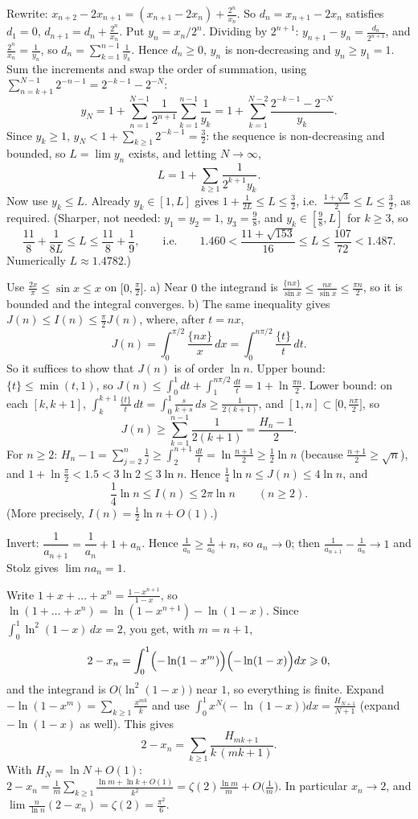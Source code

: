 \documentclass[11pt,a4paper]{article}
\begin{document}
 Rewrite: $x_{n+2}-2x_{n+1}=(x_{n+1}-2x_n)+\frac{2^n}{x_n}$. So $d_n=x_{n+1}-2x_n$ satisfies $d_1=0$, $d_{n+1}=d_n+\frac{2^n}{x_n}$.
 Put $y_n=x_n/2^n$. Dividing by $2^{n+1}$: $y_{n+1}-y_n=\frac{d_n}{2^{n+1}}$, and $\frac{2^n}{x_n}=\frac1{y_n}$, so $d_n=\sum_{k=1}^{n-1}\frac1{y_k}$. Hence $d_n\ge0$, $y_n$ is non-decreasing and $y_n\ge y_1=1$.
 Sum the increments and swap the order of summation, using $\sum_{n=k+1}^{N-1}2^{-n-1}=2^{-k-1}-2^{-N}$:
\[y_N=1+\sum_{n=1}^{N-1}\frac1{2^{n+1}}\sum_{k=1}^{n-1}\frac1{y_k}=1+\sum_{k=1}^{N-2}\frac{2^{-k-1}-2^{-N}}{y_k}.\]
Since $y_k\ge1$, $y_N<1+\sum_{k\ge1}2^{-k-1}=\frac32$: the sequence is non-decreasing and bounded, so $L=\lim y_n$ exists, and letting $N\to\infty$,
\[L=1+\sum_{k\ge1}\frac1{2^{k+1}y_k}.\]
 Now use $y_k\le L$. Already $y_k\in[1,L]$ gives $1+\frac1{2L}\le L\le\frac32$, i.e.\ $\frac{1+\sqrt3}2\le L\le\frac32$, as required. (Sharper, not needed: $y_1=y_2=1$, $y_3=\frac98$, and $y_k\in[\frac98,L]$ for $k\ge3$, so
\[\frac{11}8+\frac1{8L}\le L\le\frac{11}8+\frac19,\qquad\text{i.e.}\qquad 1.460<\frac{11+\sqrt{153}}{16}\le L\le\frac{107}{72}<1.487.\]
Numerically $L\approx1.4782$.)

 Use $\frac{2x}\pi\le\sin x\le x$ on $\bigl[0,\frac\pi2\bigr]$. a) Near $0$ the integrand is $\frac{\{nx\}}{\sin x}\le\frac{nx}{\sin x}\le\frac{\pi n}2$, so it is bounded and the integral converges. b) The same inequality gives $J(n)\le I(n)\le\frac\pi2J(n)$, where, after $t=nx$,
\[J(n)=\int_0^{\pi/2}\frac{\{nx\}}x\,dx=\int_0^{n\pi/2}\frac{\{t\}}t\,dt.\]
So it suffices to show that $J(n)$ is of order $\ln n$.
 Upper bound: $\{t\}\le\min(t,1)$, so $J(n)\le\int_0^1dt+\int_1^{n\pi/2}\frac{dt}t=1+\ln\frac{\pi n}2$. Lower bound: on each $[k,k+1]$, $\int_k^{k+1}\frac{\{t\}}t\,dt=\int_0^1\frac s{k+s}\,ds\ge\frac1{2(k+1)}$, and $[1,n]\subset\bigl[0,\frac{n\pi}2\bigr]$, so
\[J(n)\ge\sum_{k=1}^{n-1}\frac1{2(k+1)}=\frac{H_n-1}2.\]
 For $n\ge2$: $H_n-1=\sum_{j=2}^n\frac1j\ge\int_2^{n+1}\frac{dt}t=\ln\frac{n+1}2\ge\frac12\ln n$ (because $\frac{n+1}2\ge\sqrt n$), and $1+\ln\frac\pi2<1.5<3\ln2\le3\ln n$. Hence $\frac14\ln n\le J(n)\le4\ln n$, and
\[\frac14\ln n\le I(n)\le2\pi\ln n\qquad(n\ge2).\]
(More precisely, $I(n)=\frac12\ln n+O(1)$.)

 Invert: $\dfrac1{a_{n+1}}=\dfrac1{a_n}+1+a_n$.
 Hence $\frac1{a_n}\ge\frac1{a_0}+n$, so $a_n\to0$; then $\frac1{a_{n+1}}-\frac1{a_n}\to1$ and Stolz gives $\lim na_n=1$.

 Write $1+x+\dots+x^n=\frac{1-x^{n+1}}{1-x}$, so $\ln(1+\dots+x^n)=\ln(1-x^{n+1})-\ln(1-x)$. Since $\int_0^1\ln^2(1-x)\,dx=2$, you get, with $m=n+1$,
\[2-x_n=\int_0^1\Bigl(-\ln(1-x^m)\Bigr)\Bigl(-\ln(1-x)\Bigr)dx\ge0,\]
and the integrand is $O\bigl(\ln^2(1-x)\bigr)$ near $1$, so everything is finite.
 Expand $-\ln(1-x^m)=\sum_{k\ge1}\frac{x^{mk}}k$ and use $\int_0^1x^N\bigl(-\ln(1-x)\bigr)dx=\frac{H_{N+1}}{N+1}$ (expand $-\ln(1-x)$ as well). This gives
\[2-x_n=\sum_{k\ge1}\frac{H_{mk+1}}{k\,(mk+1)}.\]
 With $H_N=\ln N+O(1)$: $2-x_n=\frac1m\sum_{k\ge1}\frac{\ln m+\ln k+O(1)}{k^2}=\zeta(2)\frac{\ln m}m+O\bigl(\frac1m\bigr)$. In particular $x_n\to2$, and $\lim\frac n{\ln n}(2-x_n)=\zeta(2)=\frac{\pi^2}6$.
\end{document}
